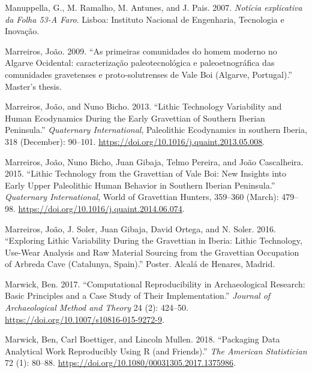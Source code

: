 \documentclass[
  a4paper,
  DIV=11,
  numbers=noendperiod]{scrreprt}
\newlength{\cslhangindent}
\newenvironment{CSLReferences}[2] %
 {\begin{list}{}{%
  \setlength{\itemindent}{0pt}
  \setlength{\leftmargin}{0pt}
  \setlength{\parsep}{0pt}
  \ifodd #1
   \setlength{\leftmargin}{\cslhangindent}
   \setlength{\itemindent}{-1\cslhangindent}
  \fi
  \setlength{\itemsep}{#2\baselineskip}}}
 {\end{list}}
\begin{document}
\begin{CSLReferences}{1}{0}
Manuppella, G., M. Ramalho, M. Antunes, and J. Pais. 2007.
\emph{{Not{í}cia explicativa da Folha 53-A Faro}}. Lisboa: Instituto
Nacional de Engenharia, Tecnologia e Inova{ç}{ã}o.

Marreiros, João. 2009. {``{As primeiras comunidades do homem moderno no
Algarve Ocidental: caracteriza{ç}{ã}o paleotecnol{ó}gica e
paleoetnogr{á}fica das comunidades gravetenses e proto-solutrenses de
Vale Boi (Algarve, Portugal)}.''} Master's thesis.

Marreiros, João, and Nuno Bicho. 2013. {``Lithic Technology Variability
and Human Ecodynamics During the {Early Gravettian} of {Southern Iberian
Peninsula}.''} \emph{Quaternary International}, Paleolithic
{Ecodynamics} in southern {Iberia}, 318 (December): 90--101.
\url{https://doi.org/10.1016/j.quaint.2013.05.008}.

Marreiros, João, Nuno Bicho, Juan Gibaja, Telmo Pereira, and João
Cascalheira. 2015. {``Lithic Technology from the {Gravettian} of {Vale
Boi}: New Insights into {Early Upper Paleolithic} Human Behavior in
{Southern Iberian Peninsula}.''} \emph{Quaternary International}, World
of {Gravettian Hunters}, 359--360 (March): 479--98.
\url{https://doi.org/10.1016/j.quaint.2014.06.074}.

Marreiros, João, J. Soler, Juan Gibaja, David Ortega, and N. Soler.
2016. {``Exploring Lithic Variability During the {Gravettian} in
{Iberia}: {Lithic} Technology, Use-Wear Analysis and Raw Material
Sourcing from the {Gravettian} Occupation of {Arbreda Cave}
({Catalunya}, {Spain}).''} Poster. Alcal{á} de Henares, Madrid.

Marwick, Ben. 2017. {``Computational {Reproducibility} in
{Archaeological Research}: {Basic Principles} and a {Case Study} of
{Their Implementation}.''} \emph{Journal of Archaeological Method and
Theory} 24 (2): 424--50.
\url{https://doi.org/10.1007/s10816-015-9272-9}.

Marwick, Ben, Carl Boettiger, and Lincoln Mullen. 2018. {``Packaging
{Data Analytical Work Reproducibly Using R} (and {Friends}).''}
\emph{The American Statistician} 72 (1): 80--88.
\url{https://doi.org/10.1080/00031305.2017.1375986}.


\end{CSLReferences}
\end{document}
